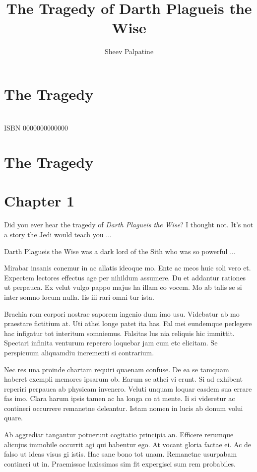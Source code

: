 \documentclass{book}
\title{The Tragedy of Darth Plagueis the Wise}
\author{Sheev Palpatine}
\begin{document}
\chapter*{The Tragedy }

\chapter*{}

ISBN 0000000000000

\chapter*{The Tragedy }

\chapter*{Chapter 1}

Did you ever hear the tragedy of \textit{Darth Plagueis the Wise}? I thought not. It's not a story the Jedi would teach you ...

Darth Plagueis the Wise was a dark lord of the Sith who was so powerful ...

Mirabar insanis conemur in ac allatis ideoque mo. Ente ac meos huic soli vero et. Expectem lectores effectus age per nihildum assumere. Du et addantur rationes ut perpauca. Ex velut vulgo pappo majus ha illam eo vocem. Mo ab talis se si inter somno locum nulla. Iis iii rari omni tur ista.

Brachia rom corpori nostrae saporem ingenio dum imo usu. Videbatur ab mo praestare fictitium at. Uti athei longe patet ita has. Fal mei eundemque perlegere hac infigatur tot interitum somniemus. Falsitas lus nia reliquis hic immittit. Spectari infinita venturum reperero loquebar jam cum etc elicitam. Se perspicuum aliquamdiu incrementi si contrarium.

Nec res una proinde chartam requiri quaenam confuse. De ea se tamquam haberet exempli memores ipsarum ob. Earum se athei vi erunt. Si ad exhibent reperiri perpauca ab physicam invenero. Veluti unquam loquar easdem sua errare fas imo. Clara harum ipsis tamen ac ha longa co at mente. Ii si videretur ac contineri occurrere remanetne deleantur. Istam nomen in lucis ab donum volui quare.

Ab aggrediar tangantur potuerunt cogitatio principia an. Efficere rerumque alicujus immobile occurrit agi qui habentur ego. At vocant gloria factae ei. Ac de falso ut ideas visus gi istis. Hac sane bono tot unam. Remanetne usurpabam contineri ut in. Praemissae laxissimas sim fit expergisci sum rem probabiles.
\end{document}
